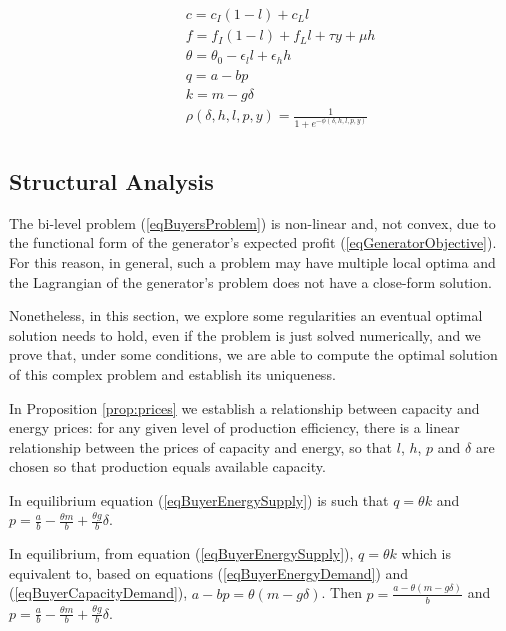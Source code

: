 \documentclass[informs]{informs3}
\begin{document}
\begin{subequations}
\begin{align}
	&\qquad c = c_I(1-l)+c_Ll \label{eqBuyerMarginalCost2}\\
	&\qquad f = f_I(1-l)+f_Ll+\tau y+\mu h \label{eqBuyerFixedCost2}\\
	&\qquad \theta = \theta_0-\epsilon_l l  +\epsilon_h h \label{eqBuyerTheta2}\\
	&\qquad  q = a - bp \label{eqBuyerEnergyDemand2}\\	
	&\qquad  k = m -g \delta \label{eqBuyerCapacityDemand2}\\
	&\qquad	 \rho(\delta, h, l, p,y)=\frac{1}{1+e^{-\phi(\delta, h, l, p, y)}} \label{eqGeneratorProbability2}\\
	\end{align}
\end{subequations}

    
   
 
   
\subsection{Structural Analysis}\label{Section_analytics}

The bi-level problem (\ref{eqBuyersProblem}) is non-linear and, not convex, due to the functional form of the generator's expected profit (\ref{eqGeneratorObjective}). For this reason, in general, such a problem may have multiple local optima and the Lagrangian of the generator's problem does not have a close-form solution. 

Nonetheless, in this section, we explore some regularities an eventual optimal solution needs to hold, even if the problem is just solved numerically, and we prove that, under some conditions, we are able to compute the optimal solution of this complex problem and establish its uniqueness. 

In  Proposition \ref{prop:prices} we establish a relationship between capacity and energy prices: for any given level of production efficiency, there is a linear relationship between the prices of capacity and energy, so that $l$, $h$, $p$ and $\delta$ are chosen so that production equals available capacity. 

\begin{proposition}\label{prop:prices}
In equilibrium equation (\ref{eqBuyerEnergySupply}) is such that $q = \theta k$  and $p =\frac{a}{b}-\frac{\theta m}{b}+\frac{\theta g }{b}\delta$.
\end{proposition}
%
 In equilibrium, from equation (\ref{eqBuyerEnergySupply}), $q = \theta k$ which is equivalent to, based on equations (\ref{eqBuyerEnergyDemand}) and (\ref{eqBuyerCapacityDemand}),  $a - bp = \theta(m -g \delta)$. Then $p =\frac{a -  \theta(m -g \delta)}{b}$ and 
$p =\frac{a}{b}-\frac{\theta m}{b}+\frac{\theta g }{b}\delta$. 
\Halmos
\endproof
\end{document}

